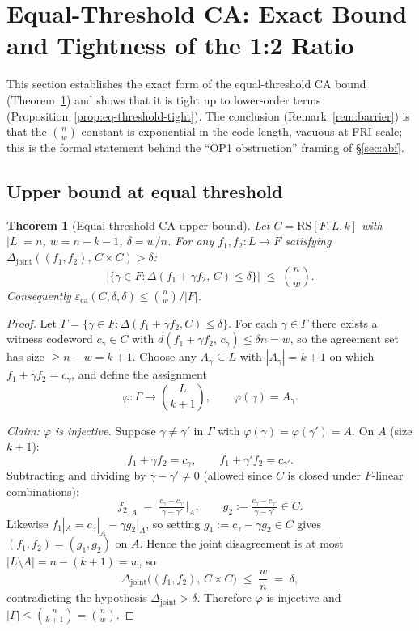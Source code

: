 \documentclass[11pt]{article}
\newtheorem{theorem}{Theorem}
\newcommand{\RS}{\mathrm{RS}}
\begin{document}
\section{Equal-Threshold CA: Exact Bound and Tightness of the 1:2 Ratio}
\label{sec:barrier}

This section establishes the exact form of the equal-threshold CA bound (Theorem~\ref{thm:eq-threshold-upper}) and shows that it is tight up to lower-order terms (Proposition~\ref{prop:eq-threshold-tight}). The conclusion (Remark~\ref{rem:barrier}) is that the $\binom{n}{w}$ constant is exponential in the code length, vacuous at FRI scale; this is the formal statement behind the ``OP1 obstruction'' framing of \S\ref{sec:abf}.

\subsection{Upper bound at equal threshold}

\begin{theorem}[Equal-threshold CA upper bound]
\label{thm:eq-threshold-upper}
Let $C = \RS[F, L, k]$ with $|L| = n$, $w = n - k - 1$, $\delta = w/n$. For any $f_1, f_2 : L \to F$ satisfying $\Delta_{\mathrm{joint}}((f_1, f_2),\, C \times C) > \delta$:
$$\bigl|\{\gamma \in F : \Delta(f_1 + \gamma f_2,\, C) \leq \delta\}\bigr| \;\leq\; \binom{n}{w}.$$
Consequently $\varepsilon_{\mathrm{ca}}(C, \delta, \delta) \leq \binom{n}{w}/|F|$.
\end{theorem}

\begin{proof}
Let $\Gamma = \{\gamma \in F : \Delta(f_1 + \gamma f_2, C) \leq \delta\}$. For each $\gamma \in \Gamma$ there exists a witness codeword $c_\gamma \in C$ with $d(f_1 + \gamma f_2,\, c_\gamma) \leq \delta n = w$, so the agreement set has size $\geq n - w = k + 1$. Choose any $A_\gamma \subseteq L$ with $|A_\gamma| = k + 1$ on which $f_1 + \gamma f_2 = c_\gamma$, and define the assignment
$$\varphi : \Gamma \to \binom{L}{k+1}, \qquad \varphi(\gamma) = A_\gamma.$$

\noindent\emph{Claim: $\varphi$ is injective.} Suppose $\gamma \neq \gamma'$ in $\Gamma$ with $\varphi(\gamma) = \varphi(\gamma') = A$. On $A$ (size $k+1$):
$$f_1 + \gamma f_2 = c_\gamma, \qquad f_1 + \gamma' f_2 = c_{\gamma'}.$$
Subtracting and dividing by $\gamma - \gamma' \neq 0$ (allowed since $C$ is closed under $F$-linear combinations):
$$f_2 \bigr|_A \;=\; \tfrac{c_\gamma - c_{\gamma'}}{\gamma - \gamma'} \bigr|_A, \qquad g_2 := \tfrac{c_\gamma - c_{\gamma'}}{\gamma - \gamma'} \in C.$$
Likewise $f_1|_A = c_\gamma|_A - \gamma g_2|_A$, so setting $g_1 := c_\gamma - \gamma g_2 \in C$ gives $(f_1, f_2) = (g_1, g_2)$ on $A$. Hence the joint disagreement is at most $|L \setminus A| = n - (k+1) = w$, so
$$\Delta_{\mathrm{joint}}\bigl((f_1, f_2),\, C \times C\bigr) \;\leq\; \frac{w}{n} \;=\; \delta,$$
contradicting the hypothesis $\Delta_{\mathrm{joint}} > \delta$. Therefore $\varphi$ is injective and $|\Gamma| \leq \binom{n}{k+1} = \binom{n}{w}$.
\end{proof}
\end{document}
